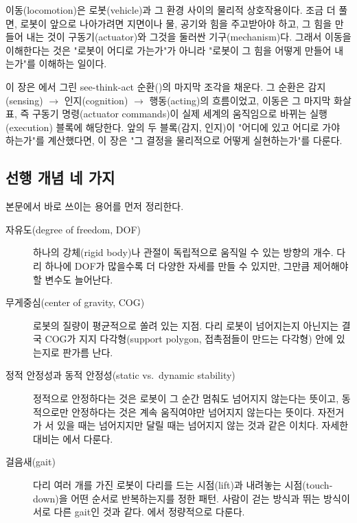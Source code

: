 이동(locomotion)은 로봇(vehicle)과 그 환경 사이의 물리적 상호작용이다. 조금 더
풀면, 로봇이 앞으로 나아가려면 지면이나 물, 공기와 힘을 주고받아야 하고, 그 힘을
만들어 내는 것이 구동기(actuator)와 그것을 둘러싼 기구(mechanism)다.
그래서 이동을 이해한다는 것은 "로봇이 어디로 가는가"가 아니라 "로봇이 그 힘을
어떻게 만들어 내는가"를 이해하는 일이다.

이 장은 에서 그린 see-think-act 순환()의
마지막 조각을 채운다. 그 순환은 감지(sensing) $\to$ 인지(cognition) $\to$
행동(acting)의 흐름이었고, 이동은 그 마지막 화살표, 즉 구동기 명령(actuator
commands)이 실제 세계의 움직임으로 바뀌는 실행(execution) 블록에 해당한다.
앞의 두 블록(감지, 인지)이 "어디에 있고 어디로 가야 하는가"를 계산했다면, 이
장은 "그 결정을 물리적으로 어떻게 실현하는가"를 다룬다.

\subsection{선행 개념 네 가지}
\label{sec:lec02-bg-prereq}

본문에서 바로 쓰이는 용어를 먼저 정리한다.

\begin{description}
  \item[자유도(degree of freedom, DOF)] 하나의 강체(rigid body)나 관절이 독립적으로
        움직일 수 있는 방향의 개수. 다리 하나에 DOF가 많을수록 더 다양한 자세를
        만들 수 있지만, 그만큼 제어해야 할 변수도 늘어난다.
  \item[무게중심(center of gravity, COG)] 로봇의 질량이 평균적으로 쏠려 있는
        지점. 다리 로봇이 넘어지는지 아닌지는 결국 COG가 지지 다각형(support
        polygon, 접촉점들이 만드는 다각형) 안에 있는지로 판가름 난다.
  \item[정적 안정성과 동적 안정성(static vs.\ dynamic stability)] 정적으로
        안정하다는 것은 로봇이 그 순간 멈춰도 넘어지지 않는다는 뜻이고, 동적으로만
        안정하다는 것은 계속 움직여야만 넘어지지 않는다는 뜻이다. 자전거가 서
        있을 때는 넘어지지만 달릴 때는 넘어지지 않는 것과 같은 이치다. 자세한
        대비는 에서 다룬다.
  \item[걸음새(gait)] 다리 여러 개를 가진 로봇이 다리를 드는 시점(lift)과
        내려놓는 시점(touch-down)을 어떤 순서로 반복하는지를 정한 패턴. 사람이
        걷는 방식과 뛰는 방식이 서로 다른 gait인 것과 같다. 에서
        정량적으로 다룬다.
\end{description}

